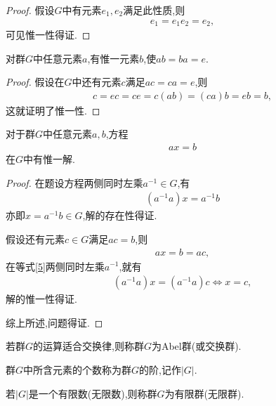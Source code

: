 \begin{proof}
    假设$G$中有元素$e_1,e_2$满足此性质,则\begin{align*}
        e_1=e_1e_2=e_2,
    \end{align*}可见惟一性得证.
\end{proof}
\begin{proposition}[逆元惟一性]
    对群$G$中任意元素$a$,有惟一元素$b$,使$ab=ba=e$.
\end{proposition}
\begin{proof}
    假设在$G$中还有元素$c$满足$ac=ca=e$,则\begin{align*}
        c=ec=ce=c(ab)=(ca)b=eb=b,
    \end{align*}这就证明了惟一性.
\end{proof}
\begin{proposition}
    对于群$G$中任意元素$a,b$,方程\begin{align*}
        ax=b
    \end{align*}在$G$中有惟一解.
\end{proposition}
\begin{proof}
    在题设方程两侧同时左乘$a^{-1}\in G$,有\begin{align*}
        (a^{-1}a)x=a^{-1}b
    \end{align*}亦即$x=a^{-1}b\in G$,解的存在性得证.

    假设还有元素$c\in G$满足$ac=b$,则\begin{align}
        ax=b=ac,\label{5}
    \end{align}在等式\eqref{5}两侧同时左乘$a^{-1}$,就有\begin{align*}
        (a^{-1}a)x=(a^{-1}a)c\iff x=c,
    \end{align*}解的惟一性得证.

    综上所述,问题得证.
\end{proof}
\begin{definition}
    若群$G$的运算适合交换律,则称群$G$为Abel群(或交换群).
\end{definition}
\begin{definition}[阶]
    群$G$中所含元素的个数称为群$G$的阶,记作$|G|$.
\end{definition}
\begin{definition}[有限群与无限群]
    若$|G|$是一个有限数(无限数),则称群$G$为有限群(无限群).
\end{definition}
